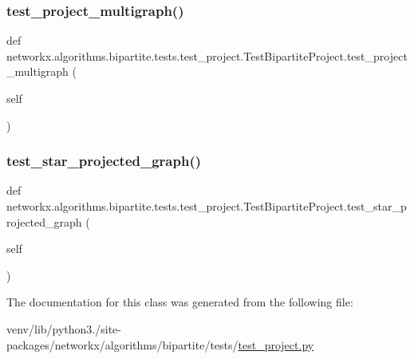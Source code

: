 \subsubsection{\texorpdfstring{test\+\_\+project\+\_\+multigraph()}{test\_project\_multigraph()}}
{\footnotesize\ttfamily def networkx.\+algorithms.\+bipartite.\+tests.\+test\+\_\+project.\+Test\+Bipartite\+Project.\+test\+\_\+project\+\_\+multigraph (\begin{DoxyParamCaption}\item[{}]{self }\end{DoxyParamCaption})}

\mbox{\label{classnetworkx_1_1algorithms_1_1bipartite_1_1tests_1_1test__project_1_1TestBipartiteProject_ac15fcd186ae0378087c6534269340109}} 
\subsubsection{\texorpdfstring{test\+\_\+star\+\_\+projected\+\_\+graph()}{test\_star\_projected\_graph()}}
{\footnotesize\ttfamily def networkx.\+algorithms.\+bipartite.\+tests.\+test\+\_\+project.\+Test\+Bipartite\+Project.\+test\+\_\+star\+\_\+projected\+\_\+graph (\begin{DoxyParamCaption}\item[{}]{self }\end{DoxyParamCaption})}



The documentation for this class was generated from the following file\+:\begin{DoxyCompactItemize}
\item 
venv/lib/python3./site-\/packages/networkx/algorithms/bipartite/tests/\hyperlink{test__project_8py}{test\+\_\+project.\+py}\end{DoxyCompactItemize}
